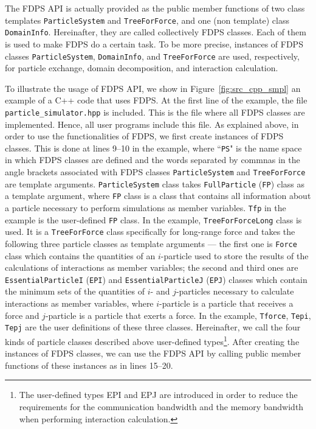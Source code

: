 \documentclass[twocolumn,useamsfonts]{pasj01}
\begin{document}
The FDPS API is actually provided as the public member functions of two class templates \texttt{ParticleSystem} and \texttt{TreeForForce}, and one (non template) class \texttt{DomainInfo}. Hereinafter, they are called collectively FDPS classes. Each of them is used to make FDPS do a certain task. To be more precise, instances of FDPS classes \texttt{ParticleSystem}, \texttt{DomainInfo}, and \texttt{TreeForForce} are used, respectively, for particle exchange, domain decomposition, and interaction calculation.

To illustrate the usage of FDPS API, we show in Figure~\ref{fig:src_cpp_smpl} an example of a C++ code that uses FDPS. At the first line of the example, the file \texttt{particle\_simulator.hpp} is included. This is the file where all FDPS classes are implemented. Hence, all user programs include this file. As explained above, in order to use the functionalities of FDPS, we first create instances of FDPS classes. This is done at lines 9--10 in the example, where ``\texttt{PS}" is the name space in which FDPS classes are defined and the words separated by commnas in the angle brackets associated with FDPS classes \texttt{ParticleSystem} and \texttt{TreeForForce} are template arguments. \texttt{ParticleSystem} class takes \texttt{FullParticle} (\texttt{FP}) class as a template argument, where \texttt{FP} class is a class that contains all information about a particle necessary to perform simulations as member variables. \texttt{Tfp} in the example is the user-defined \texttt{FP} class. In the example, \texttt{TreeForForceLong} class is used. It is a \texttt{TreeForForce} class specifically for long-range force and takes the following three particle classes as template arguments --- the first one is \texttt{Force} class which  contains the quantities of an $i$-particle used to store the results of the calculations of interactions as member variables; the second and third ones are \texttt{EssentialParticleI} (\texttt{EPI}) and \texttt{EssentialParticleJ} (\texttt{EPJ}) classes which contain the minimum sets of the quantities of $i$- and $j$-particles necessary to calculate interactions as member variables, where $i$-particle is a particle that receives a force and $j$-particle is a particle that exerts a force. In the example, \texttt{Tforce}, \texttt{Tepi}, \texttt{Tepj} are the user definitions of these three classes. Hereinafter, we call the four kinds of particle classes described above user-defined types\footnote{The user-defined types EPI and EPJ are introduced in order to reduce the requirements for the communication bandwidth and the memory bandwidth when performing interaction calculation.}. After creating the instances of FDPS classes, we can use the FDPS API by calling public member functions of these instances as in lines 15--20. 
\end{document}
